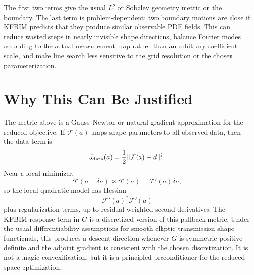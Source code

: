 \documentclass[11pt]{article}
\begin{document}
The first two terms give the usual $L^2$ or Sobolev geometry metric on the
boundary.  The last term is problem-dependent: two boundary motions are close
if KFBIM predicts that they produce similar observable PDE fields.  This can
reduce wasted steps in nearly invisible shape directions, balance Fourier
modes according to the actual measurement map rather than an arbitrary
coefficient scale, and make line search less sensitive to the grid resolution
or the chosen parameterization.

\section*{Why This Can Be Justified}

The metric above is a Gauss--Newton or natural-gradient approximation for the
reduced objective.  If $\mathcal{F}(a)$ maps shape parameters to all observed
data, then the data term is
\[
    J_{\rm data}(a)
    =
    \frac12\|\mathcal{F}(a)-d\|^2.
\]
Near a local minimizer,
\[
    \mathcal{F}(a+\delta a)
    \approx
    \mathcal{F}(a)+\mathcal{F}'(a)\delta a,
\]
so the local quadratic model has Hessian
\[
    \mathcal{F}'(a)^*\mathcal{F}'(a)
\]
plus regularization terms, up to residual-weighted second derivatives.  The
KFBIM response term in $G$ is a discretized version of this
pullback metric.  Under the usual differentiability assumptions for smooth
elliptic transmission shape functionals, this produces a descent direction
whenever $G$ is symmetric positive definite and the adjoint gradient is
consistent with the chosen discretization.  It is not a magic convexification,
but it is a principled preconditioner for the reduced-space optimization.
\end{document}
